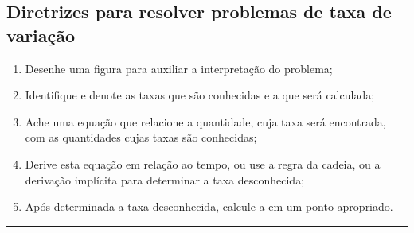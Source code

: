 \cleardoublepage\documentclass[../main.tex]{subfiles}
\begin{document}
\subsection{\hspace{-0.3cm}Diretrizes para resolver problemas de taxa de variação}
\begin{enumerate}[1.]
\item  Desenhe uma figura para auxiliar a interpretação do problema; 
\item Identifique e denote as taxas que são conhecidas e a que será calculada; 
\item  Ache uma equação que relacione a quantidade, cuja taxa será encontrada, com as quantidades 
 cujas taxas são conhecidas; 
\item Derive esta equação em relação ao tempo, ou use a regra da cadeia, ou a derivação implícita 
 para determinar a taxa desconhecida; 
\item Após determinada a taxa desconhecida, calcule-a em um ponto apropriado. 
\end{enumerate}
\hrule
\end{document}
